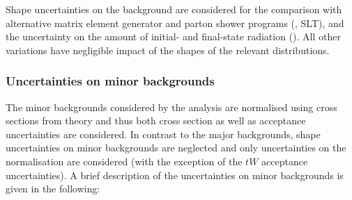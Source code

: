 Shape uncertainties on the \ttbar background are considered for the
comparison with alternative matrix element generator and parton shower
programs (\hadhad, \lephad SLT), and the uncertainty on the amount of
initial- and final-state radiation (\hadhad). All other variations
have negligible impact of the shapes of the relevant distributions.


\subsubsection{Uncertainties on minor backgrounds}

The minor backgrounds considered by the analysis are normalised using
cross sections from theory and thus both cross section as well as
acceptance uncertainties are considered. In contrast to the major
backgrounds, shape uncertainties on minor backgrounds are neglected
and only uncertainties on the normalisation are considered (with the
exception of the $tW$ acceptance uncertainties).  A brief description
of the uncertainties on minor backgrounds is given in the following:

